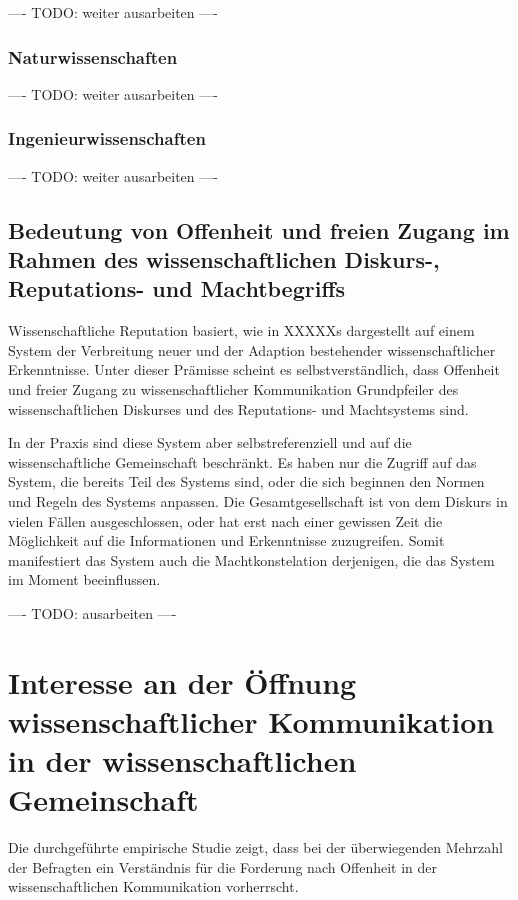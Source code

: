 ---- TODO: weiter ausarbeiten ----

\subsubsection{Naturwissenschaften}

---- TODO: weiter ausarbeiten ----

\subsubsection{Ingenieurwissenschaften}

---- TODO: weiter ausarbeiten ----

\subsection{Bedeutung von Offenheit und freien Zugang im Rahmen des wissenschaftlichen Diskurs-, Reputations- und Machtbegriffs}

Wissenschaftliche Reputation basiert, wie in XXXXXs dargestellt auf einem System der Verbreitung neuer und der Adaption bestehender wissenschaftlicher Erkenntnisse. Unter dieser Prämisse scheint es selbstverständlich, dass Offenheit und freier Zugang zu wissenschaftlicher Kommunikation Grundpfeiler des wissenschaftlichen Diskurses und des Reputations- und Machtsystems sind.

In der Praxis sind diese System aber selbstreferenziell und auf die wissenschaftliche Gemeinschaft beschränkt. Es haben nur die Zugriff auf das System, die bereits Teil des Systems sind, oder die sich beginnen den Normen und Regeln des Systems anpassen. Die Gesamtgesellschaft ist von dem Diskurs in vielen Fällen ausgeschlossen, oder hat erst nach einer gewissen Zeit die Möglichkeit auf die Informationen und Erkenntnisse zuzugreifen. Somit manifestiert das System auch die Machtkonstelation derjenigen, die das System im Moment beeinflussen.

---- TODO: ausarbeiten ----

\section{Interesse an der Öffnung wissenschaftlicher Kommunikation in der wissenschaftlichen Gemeinschaft}


Die durchgeführte empirische Studie zeigt, dass bei der überwiegenden Mehrzahl der Befragten ein Verständnis für die Forderung nach Offenheit in der wissenschaftlichen Kommunikation vorherrscht.

